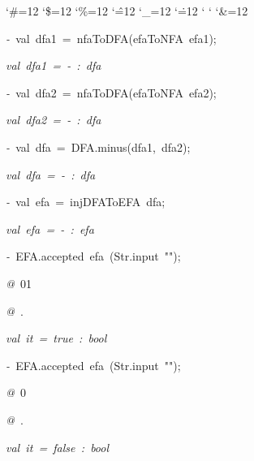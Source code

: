 \begin{list}{}
{\setlength{\leftmargin}{\leftmargini}
\setlength{\rightmargin}{0cm}
\setlength{\itemindent}{0cm}
\setlength{\listparindent}{0cm}
\setlength{\itemsep}{0cm}
\setlength{\parsep}{0cm}
\setlength{\labelsep}{0cm}
\setlength{\labelwidth}{0cm}
\catcode`\#=12
\catcode`\$=12
\catcode`\%=12
\catcode`\^=12
\catcode`\_=12
\catcode`\.=12
\catcode`
\catcode`
\catcode`\&=12
\ttfamily}
\small
\item[]\textsl{-\ }val\ dfa1\ =\ nfaToDFA(efaToNFA\ efa1);
\item[]\textsl{val\ dfa1\ =\ -\ :\ dfa}
\item[]\textsl{-\ }val\ dfa2\ =\ nfaToDFA(efaToNFA\ efa2);
\item[]\textsl{val\ dfa2\ =\ -\ :\ dfa}
\item[]\textsl{-\ }val\ dfa\ =\ DFA.minus(dfa1,\ dfa2);
\item[]\textsl{val\ dfa\ =\ -\ :\ dfa}
\item[]\textsl{-\ }val\ efa\ =\ injDFAToEFA\ dfa;
\item[]\textsl{val\ efa\ =\ -\ :\ efa}
\item[]\textsl{-\ }EFA.accepted\ efa\ (Str.input\ "");
\item[]\textsl{@\ }01
\item[]\textsl{@\ }.
\item[]\textsl{val\ it\ =\ true\ :\ bool}
\item[]\textsl{-\ }EFA.accepted\ efa\ (Str.input\ "");
\item[]\textsl{@\ }0
\item[]\textsl{@\ }.
\item[]\textsl{val\ it\ =\ false\ :\ bool}
\end{list}
